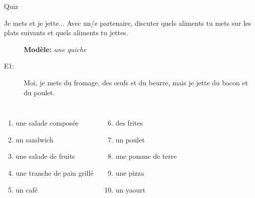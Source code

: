 \documentclass{beamer}
\begin{document}
  \begin{frame}{}
    \begin{center}
      \Large Quiz
    \end{center}
  \end{frame}

  \begin{frame}{Je mets et je jette...}
    Avec un/e partenaire, discuter quels aliments tu \alert{mets} sur les plats suivants et quels aliments tu \alert{jettes}. \\
    \begin{description}
      \item[] \textbf{Modèle:} \emph{une quiche}
      \item[E1:] Moi, je mets du fromage, des œufs et du beurre, mais je jette du bacon et du poulet.
    \end{description}
    \begin{columns}
        \begin{enumerate}
          \item une salade composée
          \item un sandwich
          \item une salade de fruits
          \item une tranche de pain grillé
          \item un café
        \end{enumerate}
        \begin{enumerate}
          \setcounter{enumi}{5}
          \item des frites
          \item un poulet
          \item une pomme de terre
          \item une pizza
          \item un yaourt
        \end{enumerate}
    \end{columns}
  \end{frame}
\end{document}
